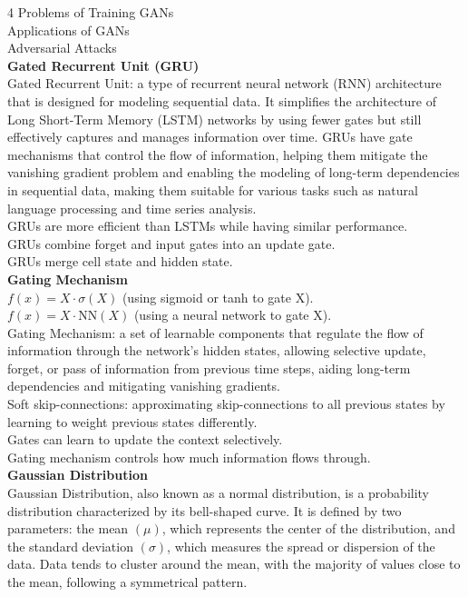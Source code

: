 \documentclass[8pt]{extarticle}
\begin{document}
\begin{multicols}{4}
Problems of Training GANs\\
Applications of GANs\\
Adversarial Attacks\\
\vspace{2pt}\textbf{Gated Recurrent Unit (GRU)}\\
Gated Recurrent Unit: a type of recurrent neural network (RNN) architecture that is designed for modeling sequential data. It simplifies the architecture of Long Short-Term Memory (LSTM) networks by using fewer gates but still effectively captures and manages information over time. GRUs have gate mechanisms that control the flow of information, helping them mitigate the vanishing gradient problem and enabling the modeling of long-term dependencies in sequential data, making them suitable for various tasks such as natural language processing and time series analysis.\\
GRUs are more efficient than LSTMs while having similar performance.\\
GRUs combine forget and input gates into an update gate.\\
GRUs merge cell state and hidden state.\\
\vspace{2pt}\textbf{Gating Mechanism}\\
$f(x) = X \cdot \sigma(X)$ (using sigmoid or tanh to gate X).\\
$f(x) = X \cdot \text{NN}(X)$ (using a neural network to gate X).\\
Gating Mechanism: a set of learnable components that regulate the flow of information through the network's hidden states, allowing selective update, forget, or pass of information from previous time steps, aiding long-term dependencies and mitigating vanishing gradients.\\
Soft skip-connections: approximating skip-connections to all previous states by learning to weight previous states differently.\\
Gates can learn to update the context selectively.\\
Gating mechanism controls how much information flows through.\\
\vspace{2pt}\textbf{Gaussian Distribution}\\
Gaussian Distribution, also known as a normal distribution, is a probability distribution characterized by its bell-shaped curve. It is defined by two parameters: the mean $(\mu)$, which represents the center of the distribution, and the standard deviation $(\sigma)$, which measures the spread or dispersion of the data. Data tends to cluster around the mean, with the majority of values close to the mean, following a symmetrical pattern.\\

\end{multicols}
\end{document}
